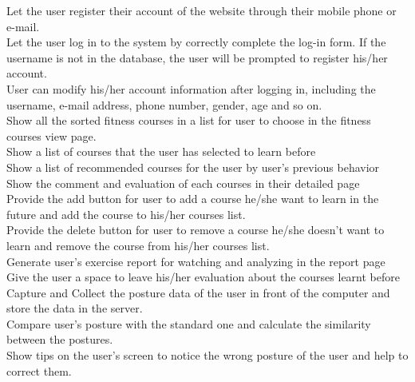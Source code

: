 \documentclass[16pt]{scrreprt}
\begin{document}
Let the user register their account of the website through their mobile phone or e-mail.\\

 
Let the user log in to the system by correctly complete the log-in form. If the username is not in the database, the user will be prompted to register his/her account.\\

 
User can modify his/her account information after logging in, including the username, e-mail address, phone number, gender, age and so on.\\

 
Show all the sorted fitness courses in a list for user to choose in the fitness courses view page. \\

 
Show a list of courses that the user has selected to learn before\\

 
Show a list of recommended courses for the user by user's previous behavior \\

 
Show the comment and evaluation of each courses in their detailed page\\

 
Provide the add button for user to add a course he/she want to learn in the future and add the course to his/her courses list.\\

 
Provide the delete button for user to remove a course he/she doesn't want to learn and remove the course from his/her courses list.\\


Generate user's exercise report for watching and analyzing in the report page\\
 
Give the user a space to leave his/her evaluation about the courses learnt before\\

Capture and Collect the posture data of the user in front of the computer and store the data in the server.\\


Compare user's posture with the standard one and calculate the similarity between the postures.\\


Show tips on the user's screen to notice the wrong posture of the user and help to correct them.\\
\end{document}
